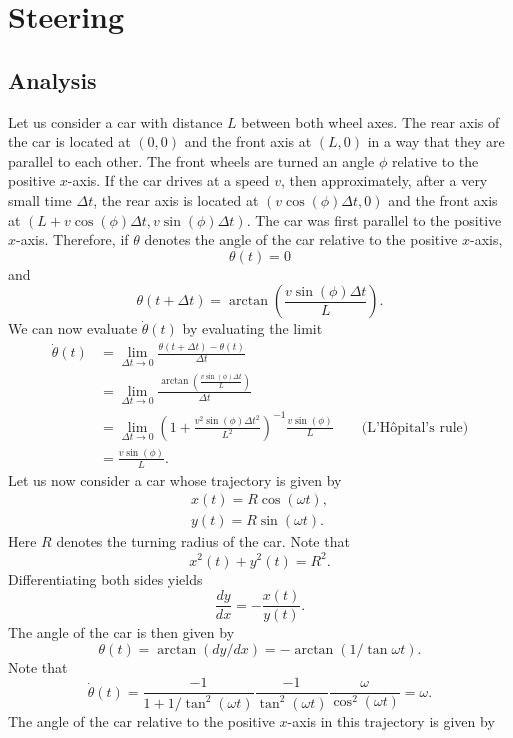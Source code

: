 \documentclass[11pt,titlepage]{report}
\begin{document}
\newcommand{\mat}[1]{\mathbf{#1}}

\chapter*{Steering}
\section*{Analysis}
Let us consider a car with distance $L$ between both wheel axes. The rear axis of the car is located at $(0,0)$ and the front axis at $(L,0)$ in a way that they are parallel to each other. The front wheels are turned an angle $\phi$ relative to the positive $x$-axis. If the car drives at a speed $v$, then approximately, after a very small time $\Delta t$, the rear axis is located at $(v \cos{(\phi)}\Delta t,0)$ and the front axis at $(L+v \cos{(\phi)}\Delta t,v \sin{(\phi)}\Delta t)$. The car was first parallel to the positive $x$-axis. Therefore, if $\theta$ denotes the angle of the car relative to the positive $x$-axis,
\[
	\theta(t) = 0
\]
and
\[
	\theta(t+\Delta t)=\arctan{\left(\frac{v \sin{(\phi)}\Delta t}{L}\right)}.
\]
We can now evaluate $\dot{\theta}(t)$ by evaluating the limit
\begin{align}
	\dot{\theta}(t) &= \lim_{\Delta t \rightarrow 0} \frac{\theta(t+\Delta t)-\theta(t)}{\Delta t} \nonumber \\
	&= \lim_{\Delta t \rightarrow 0} \frac{\arctan{\left(\frac{v \sin{(\phi)}\Delta t}{L}\right)}}{\Delta t} \nonumber \\
	&= \lim_{\Delta t \rightarrow 0} \left(1+\frac{v^2 \sin{(\phi)}\Delta t^2}{L^2}\right)^{-1}\frac{v \sin{(\phi)}}{L} \quad \quad \text{(L'H\^opital's rule)} \nonumber \\
	&= \frac{v \sin{(\phi)}}{L}. \label{eq:steering-derivative}
\end{align}
Let us now consider a car whose trajectory is given by
\begin{align*}
	x(t) = R \cos{(\omega t)}, \\
	y(t) = R \sin{(\omega t)}.
\end{align*}
Here $R$ denotes the turning radius of the car. Note that
\[
	x^2(t)+y^2(t)=R^2.
\]
Differentiating both sides yields
\[
	\frac{dy}{dx}=-\frac{x(t)}{y(t)}.
\]
The angle of the car is then given by
\[
	\theta(t) = \arctan{(dy/dx)} = -\arctan{(1/\tan{\omega t})}.
\]
Note that
\[
	\dot{\theta}(t) = \frac{-1}{1+1/\tan^2{(\omega t)}} \frac{-1}{\tan^2{(\omega t)}} \frac{\omega}{\cos^2{(\omega t)}} = \omega.
\]
The angle of the car relative to the positive $x$-axis in this trajectory is given by
\end{document}
